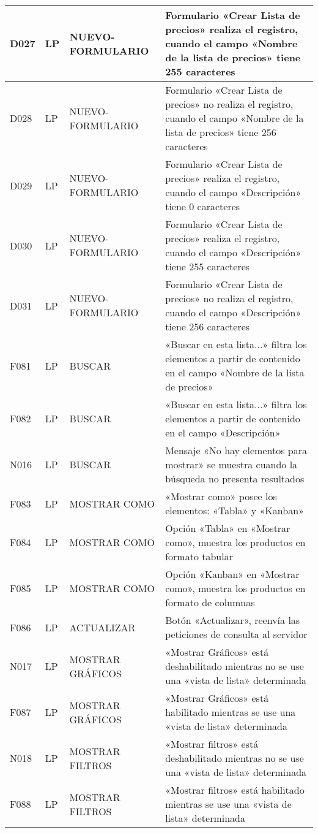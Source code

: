 \begin{landscape}
\begin{longtable}[htb]{|l|l|p{5.0cm}|p{13.0cm}|}
D027 & LP & NUEVO-FORMULARIO & Formulario «Crear Lista de precios» realiza el registro, cuando el campo «Nombre de la lista de precios» tiene 255 caracteres \\ \hline
D028 & LP & NUEVO-FORMULARIO & Formulario «Crear Lista de precios» no realiza el registro, cuando el campo «Nombre de la lista de precios» tiene 256 caracteres \\ \hline
D029 & LP & NUEVO-FORMULARIO & Formulario «Crear Lista de precios» realiza el registro, cuando el campo «Descripción» tiene 0 caracteres \\ \hline
D030 & LP & NUEVO-FORMULARIO & Formulario «Crear Lista de precios» realiza el registro, cuando el campo «Descripción» tiene 255 caracteres \\ \hline
D031 & LP & NUEVO-FORMULARIO & Formulario «Crear Lista de precios» no realiza el registro, cuando el campo «Descripción» tiene 256 caracteres \\ \hline
F081 & LP & BUSCAR & «Buscar en esta lista...» filtra los elementos a partir de contenido en el campo «Nombre de la lista de precios» \\ \hline
F082 & LP & BUSCAR & «Buscar en esta lista...» filtra los elementos a partir de contenido en el campo «Descripción» \\ \hline
N016 & LP & BUSCAR & Mensaje «No hay elementos para mostrar» se muestra cuando la búsqueda no presenta resultados \\ \hline
F083 & LP & MOSTRAR COMO & «Mostrar como» posee los elementos: «Tabla» y «Kanban» \\ \hline
F084 & LP & MOSTRAR COMO & Opción «Tabla» en «Mostrar como», muestra los productos en formato tabular \\ \hline
F085 & LP & MOSTRAR COMO & Opción «Kanban» en «Mostrar como», muestra los productos en formato de columnas \\ \hline
F086 & LP & ACTUALIZAR & Botón «Actualizar», reenvía las peticiones de consulta al servidor \\ \hline
N017 & LP & MOSTRAR GRÁFICOS & «Mostrar Gráficos» está deshabilitado mientras no se use una «vista de lista» determinada \\ \hline
F087 & LP & MOSTRAR GRÁFICOS & «Mostrar Gráficos» está habilitado mientras se use una «vista de lista» determinada \\ \hline
N018 & LP & MOSTRAR FILTROS & «Mostrar filtros» está deshabilitado mientras no se use una «vista de lista» determinada \\ \hline
F088 & LP & MOSTRAR FILTROS & «Mostrar filtros» está habilitado mientras se use una «vista de lista» determinada \\ \hline

\end{longtable}
\end{landscape}
